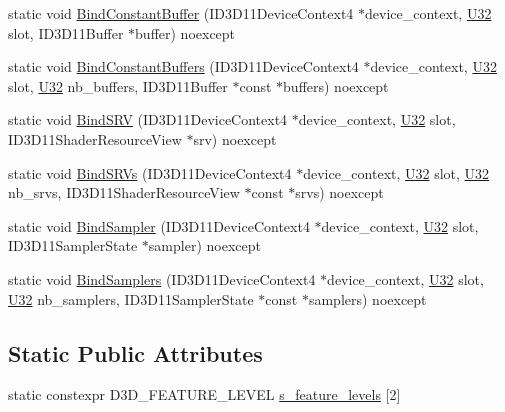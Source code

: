 \begin{DoxyCompactItemize}
\item 
static void \hyperlink{structmage_1_1_pipeline_ab4bfc69d98005a1e929c8a6b33fa07b1}{Bind\+Constant\+Buffer} (I\+D3\+D11\+Device\+Context4 $\ast$device\+\_\+context, \hyperlink{namespacemage_a41c104c036fba3756a74e19f793eeaa1}{U32} slot, I\+D3\+D11\+Buffer $\ast$buffer) noexcept
\item 
static void \hyperlink{structmage_1_1_pipeline_a85bfc6f5a5ad4ff19651a6eaf1c49406}{Bind\+Constant\+Buffers} (I\+D3\+D11\+Device\+Context4 $\ast$device\+\_\+context, \hyperlink{namespacemage_a41c104c036fba3756a74e19f793eeaa1}{U32} slot, \hyperlink{namespacemage_a41c104c036fba3756a74e19f793eeaa1}{U32} nb\+\_\+buffers, I\+D3\+D11\+Buffer $\ast$const $\ast$buffers) noexcept
\item 
static void \hyperlink{structmage_1_1_pipeline_a268c55b2697594adfc6f46afa27ec046}{Bind\+S\+RV} (I\+D3\+D11\+Device\+Context4 $\ast$device\+\_\+context, \hyperlink{namespacemage_a41c104c036fba3756a74e19f793eeaa1}{U32} slot, I\+D3\+D11\+Shader\+Resource\+View $\ast$srv) noexcept
\item 
static void \hyperlink{structmage_1_1_pipeline_a27e4163bd77a976fdb630180ffc3a4ad}{Bind\+S\+R\+Vs} (I\+D3\+D11\+Device\+Context4 $\ast$device\+\_\+context, \hyperlink{namespacemage_a41c104c036fba3756a74e19f793eeaa1}{U32} slot, \hyperlink{namespacemage_a41c104c036fba3756a74e19f793eeaa1}{U32} nb\+\_\+srvs, I\+D3\+D11\+Shader\+Resource\+View $\ast$const $\ast$srvs) noexcept
\item 
static void \hyperlink{structmage_1_1_pipeline_a1635b699c544e31912393fe234535b0f}{Bind\+Sampler} (I\+D3\+D11\+Device\+Context4 $\ast$device\+\_\+context, \hyperlink{namespacemage_a41c104c036fba3756a74e19f793eeaa1}{U32} slot, I\+D3\+D11\+Sampler\+State $\ast$sampler) noexcept
\item 
static void \hyperlink{structmage_1_1_pipeline_a4ed615377474c3b71b0c21b38842248a}{Bind\+Samplers} (I\+D3\+D11\+Device\+Context4 $\ast$device\+\_\+context, \hyperlink{namespacemage_a41c104c036fba3756a74e19f793eeaa1}{U32} slot, \hyperlink{namespacemage_a41c104c036fba3756a74e19f793eeaa1}{U32} nb\+\_\+samplers, I\+D3\+D11\+Sampler\+State $\ast$const $\ast$samplers) noexcept
\end{DoxyCompactItemize}
\subsection*{Static Public Attributes}
\begin{DoxyCompactItemize}
\item 
static constexpr D3\+D\+\_\+\+F\+E\+A\+T\+U\+R\+E\+\_\+\+L\+E\+V\+EL \hyperlink{structmage_1_1_pipeline_aa451423df031e728f3a3a35bfc942a9b}{s\+\_\+feature\+\_\+levels} \mbox{[}2\mbox{]}
\end{DoxyCompactItemize}
